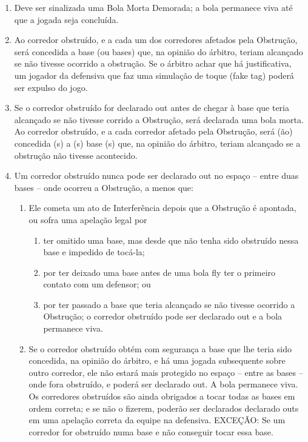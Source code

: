 \begin{multicols}{2}
	\begin{enumerate}[label=\alph*)]
		\item Deve ser sinalizada uma Bola Morta Demorada; a bola permanece viva at\'e que a jogada seja conclu\'ida. 
		
		\item  Ao corredor obstru\'ido, e a cada um dos corredores afetados pela Obstru\c{c}\~ao, ser\'a concedida a base (ou bases) que, na opini\~ao do \'arbitro, teriam alcan\c{c}ado se n\~ao tivesse ocorrido a obstru\c{c}\~ao. Se o \'arbitro achar que h\'a justificativa, um jogador da defensiva que faz uma simula\c{c}\~ao de toque (\gls{fake tag}) poder\'a ser expulso do jogo. 
		
		\item  Se o corredor obstru\'ido for declarado \gls{out} antes de chegar \`a base que teria alcan\c{c}ado se n\~ao tivesse corrido a Obstru\c{c}\~ao, ser\'a declarada uma bola morta. Ao corredor obstru\'ido, e a cada corredor afetado pela Obstru\c{c}\~ao, ser\'a (\~ao) concedida (s) a (s) base (s) que, na opini\~ao do \'arbitro, teriam alcan\c{c}ado se a obstru\c{c}\~ao n\~ao tivesse acontecido. 
		
		\item  Um corredor obstru\'ido nunca pode ser declarado \gls{out} no espa\c{c}o -- entre duas bases -- onde ocorreu a Obstru\c{c}\~ao, a menos que: 
		\begin{enumerate}[label=\roman*.]
			\item Ele cometa um ato de Interfer\^encia depois que a Obstru\c{c}\~ao \'e apontada, ou sofra uma apela\c{c}\~ao legal por 
			
			\begin{enumerate}[label=\arabic*)]
				\item ter omitido uma base, mas desde que n\~ao tenha sido obstru\'ido nessa base e impedido de toc\'a-la; 
				\item por ter deixado uma base antes de uma bola \gls{fly} ter o primeiro contato com um defensor; ou 
				\item por ter passado a base que teria alcan\c{c}ado se n\~ao tivesse ocorrido a Obstru\c{c}\~ao; o corredor obstru\'ido pode ser declarado \gls{out} e a bola permanece viva. 
			\end{enumerate}
			\item Se o corredor obstru\'ido obt\'em com seguran\c{c}a a base que lhe teria sido concedida, na opini\~ao do \'arbitro, e h\'a uma jogada subsequente sobre outro corredor, ele n\~ao estar\'a mais protegido no espa\c{c}o -- entre as bases -- onde fora obstru\'ido, e poder\'a ser declarado \gls{out}. A bola permanece viva. Os corredores obstru\'idos s\~ao ainda obrigados a tocar todas as bases em ordem correta; e se n\~ao o fizerem, poder\~ao ser declarados declarado \gls{out}s em uma apela\c{c}\~ao correta da equipe na defensiva. EXCE\c{C}\~AO: Se um corredor for obstru\'ido numa base e n\~ao conseguir tocar essa base. 
		\end{enumerate}
	\end{enumerate}
	

\end{multicols}
